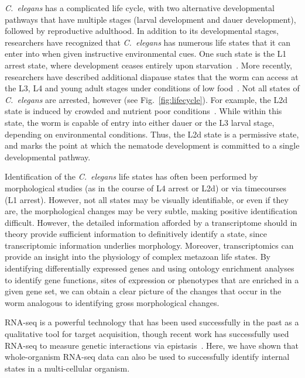 \documentclass[9pt,twocolumn,twoside]{gsag3jnl}
\newcommand{\cel}{\emph{C.~elegans}}
\begin{document}
\cel{} has a complicated life cycle, with two alternative developmental pathways
that have multiple stages (larval development and dauer development), followed
by reproductive adulthood. In addition to its developmental stages, researchers
have recognized that \cel{} has numerous life states that it can enter into when
given instructive environmental cues. One such state is the L1 arrest state,
where development ceases entirely upon starvation~\citep{Johnson1984,Baugh2006}.
More
recently, researchers have described additional diapause states that the worm
can access at the L3, L4 and young adult stages under conditions of low
food~\citep{Angelo2009,Seidel2011,Schindler2014}. Not all states of \cel{} are
arrested, however (see Fig.~\ref{fig:lifecycle}). For example, the L2d state is
induced by crowded and nutrient poor conditions~\citep{Golden1984}. While within
this state, the worm is capable of entry into either dauer or the L3 larval
stage, depending on environmental conditions. Thus, the L2d state is a
permissive state, and marks the point at which the nematode development is
committed to a single developmental pathway.

Identification of the \cel{} life states has often been performed by
morphological studies (as in the course of L4 arrest or L2d) or via timecourses
(L1 arrest). However, not all states may be visually identifiable, or even if
they are, the morphological changes may be very subtle, making positive
identification difficult. However, the detailed information afforded by a
transcriptome should in theory provide sufficient information to definitively
identify a state, since transcriptomic information underlies morphology.
Moreover, transcriptomics can provide an insight into the
physiology of complex metazoan life states. By identifying differentially
expressed genes and using ontology enrichment analyses to identify gene
functions, sites of expression or phenotypes that are enriched in a given gene
set, we can obtain a clear picture of the changes that occur in the worm
analogous to identifying gross morphological changes.

RNA-seq is a powerful technology that has been used successfully in the past as
a qualitative tool for target acquisition, though recent work has successfully
used RNA-seq to measure genetic interactions via
epistasis~\citep{Dixit2016,Angeles2017}. Here, we have shown that
whole-organism RNA-seq data can also be used to successfully identify internal
states in a multi-cellular organism.
\end{document}
